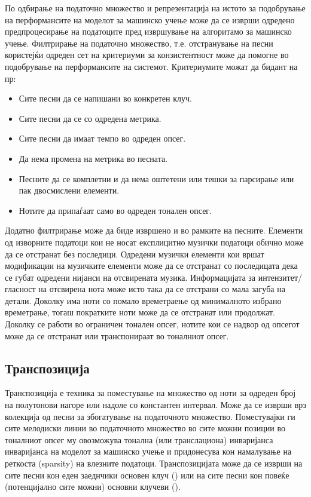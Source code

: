 По одбирање на податочно множество и репрезентација на истото за подобрување на перформансите на моделот за машинско учење може да се изврши одредено предпроцесирање на податоците пред извршување на алгоритамо за машинско учење. Филтрирање на податочно множество, т.е. отстранување на песни користејќи одреден сет на критериуми за конзистентност може да помогне во подобрување на перформансите на системот. Критериумите можат да бидант на пр:
\begin{itemize}
    \item Сите песни да се напишани во конкретен клуч.
    \item Сите песни да се со одредена метрика.
    \item Сите песни да имаат темпо во одреден опсег.
    \item Да нема промена на метрика во песната.
    \item Песните да се комплетни и да нема оштетени или тешки за парсирање или пак двосмислени елементи.
    \item Нотите да припаѓаат само во одреден тонален опсег.
\end{itemize}

Додатно филтрирање може да биде извршено и во рамките на песните. Елементи од изворните податоци кои не носат експлицитно музички податоци обично може да се отстранат без последици. Одредени музички елементи кои вршат модификации на музичките елементи може да се отстранат со последицата дека се губат одредени нијанси на отсвирената музика. Информацијата за интензитет/гласност на отсвирена нота може исто така да се отстрани со мала загуба на детали. Доколку има ноти со помало времетраење од минималното избрано времетрање, тогаш пократките ноти може да се отстранат или продолжат. Доколку се работи во ограничен тонален опсег, нотите кои се надвор од опсегот може да се отстранат или транспонираат во тоналниот опсег.

\subsection{Транспозиција}

Транспозиција е техника за поместување на множество од ноти за одреден број на полутонови нагоре или надоле со константен интервал. Може да се изврши врз колекција од песни за збогатување на податочното множество. Поместувајки ги сите мелодиски линии во податочното множество во сите можни позиции во тоналниот опсег му овозможува тонална (или транслациона) инваријанса инваријанса на моделот за машинско учење и придонесува кон намалување на реткоста (sparsity) на влезните податоци. Транспозицијата може да се изврши на сите песни кон еден заеднчики основен клуч (\cite{Sturm2016,Tikhonov2017}) или на сите песни кон повеќе (потенцијално сите можни) основни клучеви (\cite{Yang2017,Bretan2016}).

